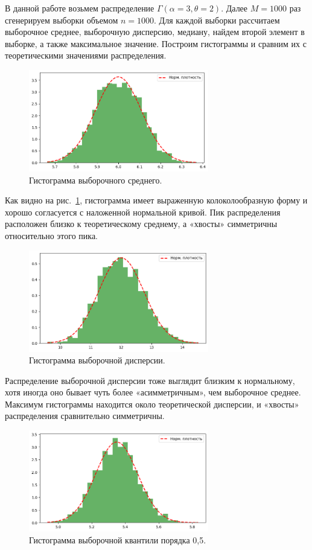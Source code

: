 \documentclass[a4paper,12pt]{article}
\begin{document}
В данной работе возьмем распределение $\Gamma(\alpha=3,\theta=2)$. Далее $M = 1000$ раз сгенерируем выборки объемом $n = 1000$.
Для каждой выборки рассчитаем выборочное среднее, выборочную дисперсию, медиану, найдем второй элемент в выборке, а также максимальное значение. Построим гистограммы и сравним их с теоретическими значениями распределения.
\begin{figure}[H]
    \centering
    \includegraphics[width=0.7\textwidth]{images/hist_mean.png}
    \caption{Гистограмма выборочного среднего.}
    \label{fig:hist_mean}
\end{figure}
Как видно на рис.~\ref{fig:hist_mean}, гистограмма имеет выраженную колоколообразную форму и хорошо согласуется с наложенной нормальной кривой. Пик распределения расположен близко к теоретическому среднему, а «хвосты» симметричны относительно этого пика. 
\begin{figure}[H]
    \centering
    \includegraphics[width=0.7\textwidth]{images/hist_var.png}
    \caption{Гистограмма выборочной дисперсии.}
    \label{fig:hist_var}
\end{figure}
Распределение выборочной дисперсии тоже выглядит близким к нормальному, хотя иногда оно бывает чуть более «асимметричным», чем выборочное среднее. Максимум гистограммы находится около теоретической дисперсии, и «хвосты» распределения сравнительно симметричны.
\begin{figure}[H]
    \centering
    \includegraphics[width=0.7\textwidth]{images/hist_med.png}
    \caption{Гистограмма выборочной квантили порядка 0,5.}
    \label{fig:hist_med}
\end{figure}
\end{document}
